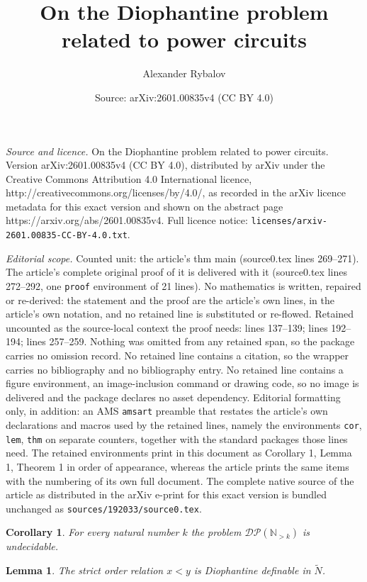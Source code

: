 \documentclass[10pt,a4paper]{amsart}
\title{On the Diophantine problem related to power circuits}
\author{Alexander Rybalov}
\date{Source: arXiv:2601.00835v4 (CC BY 4.0)}
\newtheorem{cor}{Corollary}
\newtheorem{lem}{Lemma}
\begin{document}
\maketitle

\noindent\emph{Source and licence.} On the Diophantine problem related to power circuits. Version arXiv:2601.00835v4 (CC BY 4.0), distributed by arXiv under the Creative Commons Attribution 4.0 International licence, http://creativecommons.org/licenses/by/4.0/, as recorded in the arXiv licence metadata for this exact version and shown on the abstract page https://arxiv.org/abs/2601.00835v4. Full licence notice: \texttt{licenses/arxiv-2601.00835-CC-BY-4.0.txt}.\par\smallskip

\noindent\textit{Editorial scope.} Counted unit: the article's thm main (source0.tex lines 269--271). The article's complete original proof of it is delivered with it (source0.tex lines 272--292, one \texttt{proof} environment of 21 lines). No mathematics is written, repaired or re-derived: the statement and the proof are the article's own lines, in the article's own notation, and no retained line is substituted or re-flowed.  Retained uncounted as the source-local context the proof needs: lines 137--139; lines 192--194; lines 257--259.  Nothing was omitted from any retained span, so the package carries no omission record.  No retained line contains a citation, so the wrapper carries no bibliography and no bibliography entry.  No retained line contains a figure environment, an image-inclusion command or drawing code, so no image is delivered and the package declares no asset dependency.  Editorial formatting only, in addition: an AMS \texttt{amsart} preamble that restates the article's own declarations and macros used by the retained lines, namely the environments \texttt{cor}, \texttt{lem}, \texttt{thm} on separate counters, together with the standard packages those lines need.  The retained environments print in this document as Corollary 1, Lemma 1, Theorem 1 in order of appearance, whereas the article prints the same items with the numbering of its own full document.  The complete native source of the article as distributed in the arXiv e-print for this exact version is bundled unchanged as \texttt{sources/192033/source0.tex}.
\begin{cor} \label{dpk_undec}
For every natural number $k$ the problem $\mathcal{DP}(\mathbb{N}_{>k})$ is undecidable.
\end{cor}

\begin{lem} \label{str_def}
The strict order relation $x < y$ is Diophantine definable in $\widetilde{N}$.
\end{lem}
\end{document}
